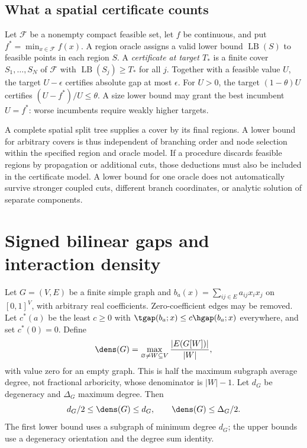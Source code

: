 \subsection{What a spatial certificate counts}\label{subsec:certificate-model}
Let $\mathcal F$ be a nonempty compact feasible set, let $f$ be continuous,
and put $f^*=\min_{x\in\mathcal F}f(x)$. A region oracle assigns a valid
lower bound $\operatorname{LB}(S)$ to feasible points in each region $S$.
A \emph{certificate at target $T_*$} is a finite cover $S_1,\ldots,S_N$
of $\mathcal F$ with $\operatorname{LB}(S_j)\ge T_*$ for all $j$.
Together with a feasible value $U$, the target $U-\epsilon$ certifies
absolute gap at most $\epsilon$. For $U>0$, the target $(1-\theta)U$
certifies $(U-f^*)/U\le\theta$. A size lower bound may grant the best
incumbent $U=f^*$: worse incumbents require weakly higher targets.

A complete spatial split tree supplies a cover by its final regions.
A lower bound for arbitrary covers is thus independent of branching order
and node selection within the specified region and oracle model. If a
procedure discards feasible regions by propagation or additional cuts,
those deductions must also be included in the certificate model. A lower
bound for one oracle does not automatically survive stronger coupled cuts,
different branch coordinates, or analytic solution of separate components.

\section{Signed bilinear gaps and interaction density}\label{sec:bilinear}
Let $G=(V,E)$ be a finite simple graph and
$b_a(x)=\sum_{ij\in E}a_{ij}x_ix_j$ on $[0,1]^V$, with arbitrary real
coefficients. Zero-coefficient edges may be removed. Let $c^*(a)$ be the
least $c\ge0$ with $\tgap(b_a;x)\le c\hgap(b_a;x)$ everywhere, and set
$c^*(0)=0$. Define
\begin{equation}\label{eq:density-definition}
 \dens(G)=\max_{\varnothing\ne W\subseteq V}\frac{|E(G[W])|}{|W|},
\end{equation}
with value zero for an empty graph. This is half the maximum subgraph
average degree, not fractional arboricity, whose denominator is $|W|-1$.
Let $d_G$ be degeneracy and $\Delta_G$ maximum degree. Then
\begin{equation}\label{eq:density-comparisons}
 d_G/2\le\dens(G)\le d_G,\qquad \dens(G)\le\Delta_G/2.
\end{equation}
The first lower bound uses a subgraph of minimum degree $d_G$; the upper
bounds use a degeneracy orientation and the degree sum identity.

